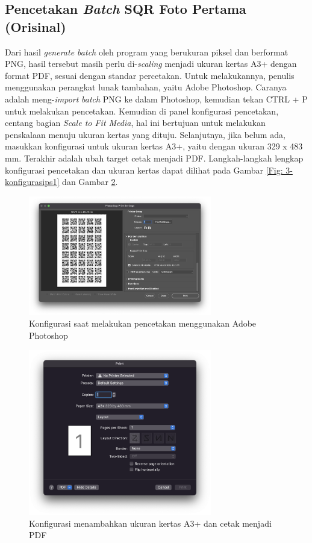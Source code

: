 \subsection{Pencetakan \emph{Batch} SQR Foto Pertama (Orisinal)} \label{Pencetakan Batch SQR Foto Pertama (Orisinal)} Dari hasil \emph{generate batch} oleh program yang berukuran piksel dan
berformat PNG, hasil tersebut masih perlu di-\emph{scaling} menjadi ukuran kertas A3+ dengan format PDF, sesuai dengan standar percetakan. Untuk melakukannya,
penulis menggunakan perangkat lunak tambahan, yaitu Adobe Photoshop. Caranya adalah meng-\emph{import} \emph{batch} PNG ke dalam Photoshop, kemudian tekan CTRL
+ P untuk melakukan pencetakan. Kemudian di panel konfigurasi pencetakan, centang bagian \emph{Scale to Fit Media}, hal ini bertujuan untuk melakukan
penskalaan menuju ukuran kertas yang dituju. Selanjutnya, jika belum ada, masukkan konfigurasi untuk ukuran kertas A3+, yaitu dengan ukuran 329 x 483 mm.
Terakhir adalah ubah target cetak menjadi PDF. Langkah-langkah lengkap konfigurasi pencetakan dan ukuran kertas dapat dilihat pada Gambar \ref{Fig:
	3-konfigurasips1} dan Gambar \ref{Fig: 3-konfigurasips2}.

\begin{figure}[!h]
	\centering
	\includegraphics[width=8cm]{contents/chapter-3/3-konfigurasips1.png}
	\caption{Konfigurasi saat melakukan pencetakan menggunakan Adobe Photoshop}
	\label{Fig: 3-konfigurasips1}
\end{figure}

\begin{figure}[!h]
	\centering
	\includegraphics[width=8cm]{contents/chapter-3/3-konfigurasips2.png}
	\caption{Konfigurasi menambahkan ukuran kertas A3+ dan cetak menjadi PDF}
	\label{Fig: 3-konfigurasips2}
\end{figure}

